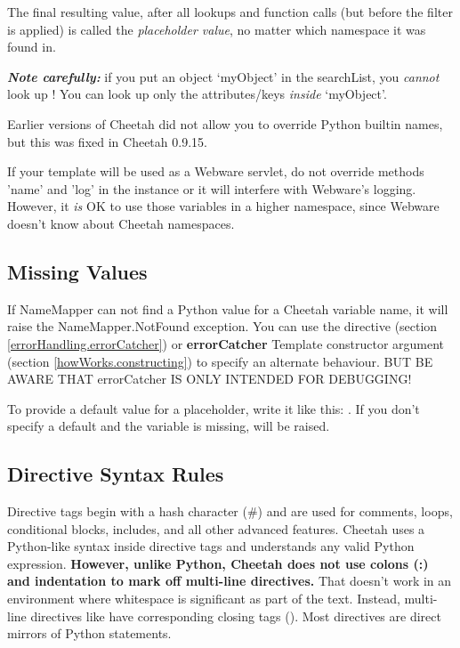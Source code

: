 The final resulting value, after all lookups and function calls (but before the
filter is applied) is called the {\em placeholder value}, no matter which 
namespace it was found in.

{\em {\bf Note carefully:}} if you put an object `myObject' in the searchList,
you {\em cannot} look up !  You can look up only the 
attributes/keys {\em inside} `myObject'.

Earlier versions of Cheetah did not allow you to override Python builtin
names, but this was fixed in Cheetah 0.9.15.  

If your template will be used as a Webware servlet, do not override methods
'name' and 'log' in the  instance or it will interfere with
Webware's logging.  However, it {\em is} OK to use those variables in a higher
namespace, since Webware doesn't know about Cheetah namespaces.


\subsection{Missing Values}
\label{language.namemapper.missing}

If NameMapper can not find a Python value for a Cheetah variable name, it will
raise the NameMapper.NotFound exception.  You can use the 
directive (section \ref{errorHandling.errorCatcher}) or {\bf errorCatcher}
Template constructor argument (section \ref{howWorks.constructing}) to specify
an alternate behaviour. BUT BE AWARE THAT errorCatcher IS ONLY INTENDED FOR
DEBUGGING!

To provide a default value for a placeholder, write it like this:
.  If you don't specify a default
and the variable is missing,  will be raised.

\subsection{Directive Syntax Rules}
\label{language.directives.syntax}


Directive tags begin with a hash character (\#) and are used for comments,
loops, conditional blocks, includes, and all other advanced features. Cheetah
uses a Python-like syntax inside directive tags and understands any valid
Python expression.  {\bf However, unlike Python, Cheetah does not use colons
(:) and indentation to mark off multi-line directives.}  That doesn't work in
an environment where whitespace is significant as part of the text.  Instead,
multi-line directives like  have  corresponding closing tags
().  Most directives are direct mirrors of Python statements.

